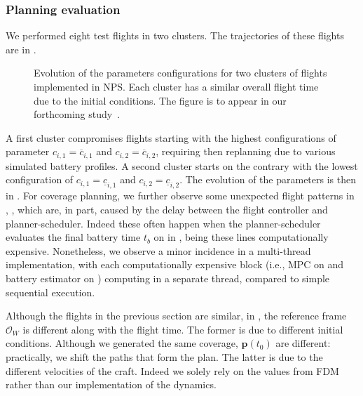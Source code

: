 \subsubsection*{Planning evaluation}

We performed eight test flights in two clusters. The trajectories of these flights are in . 
\begin{figure}[h!]
  \centering
  \selectfont
  \footnotesize    
  
  \caption[Evolution of the parameters configurations in NPS]{Evolution of the parameters configurations for two clusters of flights implemented in NPS. Each cluster has a similar overall flight time due to the initial conditions. The figure is to appear in our forthcoming study~\citep{seewald202Xenergy}.}
  \label{fig:ctls-pprz}
\end{figure}
A first cluster  compromises flights starting with the highest configurations of parameter $c_{i,1}=\overline{c}_{i,1}$ and $c_{i,2}=\overline{c}_{i,2}$, requiring then replanning due to various simulated battery profiles. A second cluster  starts on the contrary with the lowest configuration of $c_{i,1}=\underline{c}_{i,1}$ and $c_{i,2}=\underline{c}_{i,2}$. The evolution of the parameters is then in . For coverage planning, we further observe some unexpected flight patterns in , , which are, in part, caused by the delay between the flight controller and planner-scheduler. Indeed these often happen when the planner-scheduler evaluates the final battery time $t_b$ on  in , being these lines computationally expensive. Nonetheless, we observe a minor incidence in a multi-thread implementation, with each computationally expensive block (i.e., MPC on  and battery estimator on ) computing in a separate thread, compared to simple sequential execution.

Although the flights in the previous section are similar, in , the reference frame $\mathcal{O}_W$ is different along with the flight time. The former is due to different initial conditions. Although we generated the same coverage, $\mathbf{p}(t_0)$ are different: practically, we shift the paths that form the plan. The latter is due to the different velocities of the craft. Indeed we solely rely on the values from FDM rather than our implementation of the dynamics.

